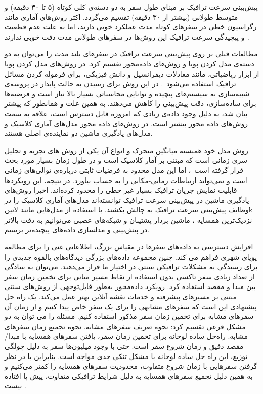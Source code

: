 
پیش‌بینی سرعت ترافیک بر مبنای طول سفر به دو دسته‌ی کلی کوتاه (۵ تا ۳۰ دقیقه) و متوسط-طولانی (بیشتر از ۳۰ دقیقه) تقسیم می‌گردد.
اکثر روش‌های آماری مانند رگراسیون خطی در سفرهای کوتاه مدت عملکرد خوبی دارند، اما به علت عدم قطعیت و پیچیدگی سرعت ترافیک این روش‌ها در سفرهای طولانی مدت دقت خوبی ندارند~.

مطالعات قبلی بر روی پیش‌بینی سرعت ترافیک در سفرهای بلند مدت را می‌توان به دو دسته‌ی مدل کردن پویا و روش‌های داده‌محور تقسیم کرد.
در روش‌های مدل کردن پویا از ابزار ریاضیاتی، مانند معادلات دیفرانسیل و دانش فیزیکی، برای فرموله کردن مسائل ترافیک استفاده می‌شود~.
در این روش برای رسیدن به حالت پایدار در پروسه‌ی شبیه‌سازی به سیستم‌های پیچیده و توانایی محاسباتی بسیار بالا نیاز است و فرضیه‌ها برای ساده‌سازی، دقت پیش‌بینی را کاهش می‌دهند.
به همین علت و همانطور که پیشتر بیان شد، به دلیل وجود داده‌ی زیادی که امروزه قابل دسترس است، علاقه به سمت روش‌های داده محور بیشتر است.
در روش‌های داده محور مدل‌های آماری کلاسیک و مدل‌های یادگیری ماشین دو نماینده‌ی اصلی هستند.

روش مدل خود همبسته میانگین متحرک و انواع آن یکی از روش های تجزیه و تحلیل سری زمانی است که مبتنی بر آمار کلاسیک است
و در طول زمان بسیار مورد بحث قرار گرفته است~،
اما این مدل محدود به فرضیات ثابتی درباره‌ی توالی‌های زمانی است و نمی‌تواند ارتباطات زمانی-مکانی را به حساب بیاورد. در نتیجه، این رویکردها قابلیت نمایش جریان ترافیک بسیار غیر خطی را محدود کرده‌اند.
اخیرا روش‌های یادگیری ماشین در پیش‌بینی سرعت ترافیک توانسته‌اند مدل‌های آماری کلاسیک را در وظایف پیش‌بینی سرعت ترافیک به چالش بکشند. با استفاده از مدل‌هایی مانند ‌لاتین{k} نزدیک‌ترین همسایه ، ماشین بردار پشتیبان  و شبکه‌های عصبی  می‌توانیم به دقت بالاتر در پیش‌بینی و مدلسازی داده‌های پیچیده‌تر برسیم.


افزایش دسترسی به داده‌های سفرها در مقیاس بزرگ، اطلاعاتی غنی را برای مطالعه پویای شهری فراهم می کند.
چنین مجموعه داده‌های بزرگی دیدگاه‌های بالقوه جدیدی را برای رسیدگی به مشکلات ترافیکی سنتی در اختیار ما قرار می‌دهند.
می‌توان به سادگی از تعداد زیادی سفر تاکسی بدون استفاده از نقاط مسیر میانی برای تخمین زمان سفر بین مبدا و مقصد استفاده کرد.
رویکرد داده‌محور به‌طور قابل‌توجهی از روش‌های سنتی مبتنی بر مسیرهای پیشرفته و خدمات نقشه آنلاین بهتر عمل می‌کند.
یک راه حل پیشنهادی این است که سفرهای مشابهی را برای یک سفر خاص پیدا کنیم و از زمان آن سفرهای مشابه برای تخمین زمان سفر مذکور استفاده کنیم.
مسئله را می توان به دو مشکل فرعی تقسیم کرد:
 نحوه تعریف سفرهای مشابه.
 نحوه تجمیع زمان سفرهای مشابه.
راه‌حل ساده لوحانه برای تخمین زمان سفر، یافتن سفرهای همسایه با مبدا/مقصد دقیق و زمان شروع سفر است.
حتی با وجود میلیون‌ها سفر به دلیل چولگی توزیع، این راه حل ساده لوحانه با مشکل تنکی جدی مواجه است.
بنابراین با در نظر گرفتن سفرهایی با زمان شروع متفاوت، محدودیت سفرهای همسایه را کمتر می‌کنیم
و به همین دلیل تجمیع سفرهای همسایه به دلیل شرایط ترافیکی متفاوت، پیش پا افتاده نیست
.

